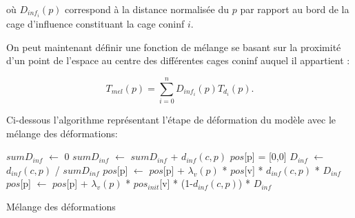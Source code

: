 où $D_{inf_i}(p)$ correspond à la distance normalisée du $p$ par rapport au
bord de la cage d'influence constituant la cage coninf $i$.

On peut maintenant définir une fonction de mélange se basant sur la proximité
d'un point de l'espace au centre des différentes cages coninf auquel il
appartient :

\begin{displaymath}
  T_{mel}(p) = \sum_{i=0}^n D_{inf_i}(p) T_{d_i}(p).
\end{displaymath}

Ci-dessous l'algorithme représentant l'étape de déformation du modèle avec le
mélange des déformations: \\

\begin{algorithm}[H]
{
  $sumD_{inf}$ $\leftarrow$ 0\;
  {
    $sumD_{inf}$ $\leftarrow$ $sumD_{inf}$ + $d_{inf}(c, p)$\;
  }
  $pos$[p] = [0,0]\; 
  {
    $D_{inf}$ $\leftarrow$ $d_{inf}(c, p)$ / $sumD_{inf}$\;
    {
      $pos$[p] $\leftarrow$ $pos$[p] + $\lambda_v(p)$ * $pos$[v] 
      * $d_{inf}(c, p)$ * $D_{inf}$\;
      $pos$[p] $\leftarrow$ $pos$[p] + $\lambda_v(p)$ * $pos_{init}$[v] 
      * (1-$d_{inf}(c, p)$) * $D_{inf}$\;
    }
  }
}
\caption{Mélange des déformations}
\end{algorithm}

